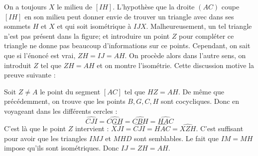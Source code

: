 \begin{sol}
\begin{center}
\end{center}

On a toujours $X$ le milieu de $[IH]$. L'hypothèse que la droite $(AC)$ coupe $[IH]$ en son milieu peut donner envie de trouver un triangle avec dans ses sommets $H$ et $X$ et qui soit isométrique à $IJX$. Malheureusement, un tel triangle n'est pas présent dans la figure; et introduire un point $Z$ pour compléter ce triangle ne donne pas beaucoup d'informations sur ce points. Cependant, on sait que si l'énoncé est vrai, $ZH=IJ=AH$. On procède alors dans l'autre sens, on introduit $Z$ tel que $ZH=AH$ et on montre l'isométrie. Cette discussion motive la preuve suivante :

Soit $Z\ne A$ le point du segment $[AC]$ tel que $HZ=AH$.
De même que précédemment, on trouve que les points $B,G,C,H$ sont cocycliques. Donc en voyageant dans les différents cercles : $$\widehat{CJI}=\widehat{CGH}=\widehat{CBH}=\widehat{HAC}$$
C'est là que le point $Z$ intervient : $\widehat{XJI}=\widehat{CJI}=\widehat{HAC}=\widehat{XZH}$. C'est suffisant pour avoir que les triangles $IMJ$ et $MHD$ sont semblables. Le fait que $IM=MH$ impose qu'ils sont isométriques. Donc $IJ=ZH=AH$.
\end{sol}


